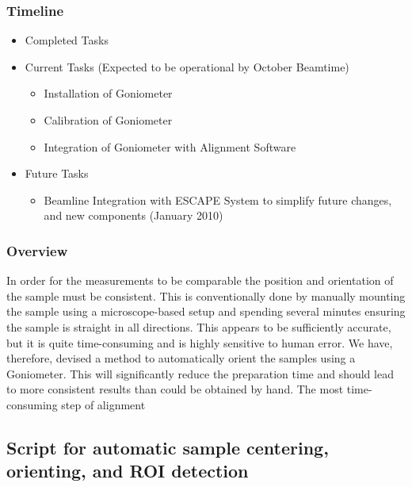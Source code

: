 \subsubsection*{Timeline}
\begin{itemize}
 	\item Completed Tasks
	\item Current Tasks (Expected to be operational by October Beamtime)
	\begin{itemize}
		\item Installation of Goniometer
		\item Calibration of Goniometer
		\item Integration of Goniometer with Alignment Software
	\end{itemize}
	\item Future Tasks
	\begin{itemize}
		\item Beamline Integration with ESCAPE System to simplify future changes, and new components (January 2010)
	\end{itemize}
\end{itemize}
\subsubsection*{Overview}
In order for the measurements to be comparable the position and orientation of the sample must be consistent. This is conventionally done by manually mounting the sample using a microscope-based setup and spending several minutes ensuring the sample is straight in all directions. This appears to be sufficiently accurate, but it is quite time-consuming and is highly sensitive to human error. We have, therefore, devised a method to automatically orient the samples using a Goniometer. This will significantly reduce the preparation time and should lead to more consistent results than could be obtained by hand. The most time-consuming step of alignment

\subsection{Script for automatic sample centering, orienting, and ROI detection}
